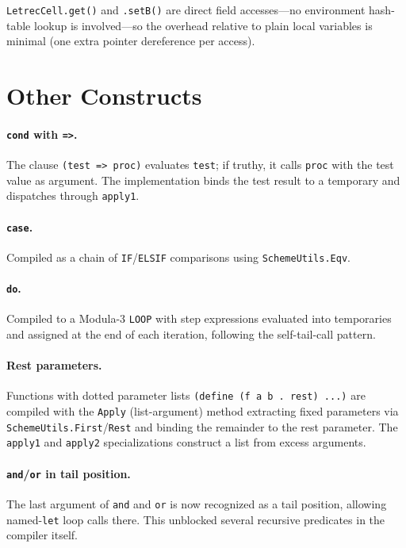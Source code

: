 \documentclass[12pt]{report}
\begin{document}
\texttt{LetrecCell.get()} and \texttt{.setB()} are direct field
accesses---no environment hash-table lookup is involved---so the
overhead relative to plain local variables is minimal (one extra
pointer dereference per access).

\section{Other Constructs}
\label{sec:gap-other}

\paragraph{\texttt{cond} with \texttt{=>}.}
The clause \texttt{(test => proc)} evaluates \texttt{test}; if
truthy, it calls \texttt{proc} with the test value as argument.
The implementation binds the test result to a temporary and
dispatches through \texttt{apply1}.

\paragraph{\texttt{case}.}
Compiled as a chain of \texttt{IF}/\texttt{ELSIF} comparisons
using \texttt{SchemeUtils.Eqv}.

\paragraph{\texttt{do}.}
Compiled to a Modula-3 \texttt{LOOP} with step expressions
evaluated into temporaries and assigned at the end of each
iteration, following the self-tail-call pattern.

\paragraph{Rest parameters.}
Functions with dotted parameter lists
\texttt{(define (f a b .\ rest) ...)} are compiled with the
\texttt{Apply} (list-argument) method extracting fixed parameters
via \texttt{SchemeUtils.First}/\texttt{Rest} and binding the
remainder to the rest parameter.  The \texttt{apply1} and
\texttt{apply2} specializations construct a list from excess
arguments.

\paragraph{\texttt{and}/\texttt{or} in tail position.}
The last argument of \texttt{and} and \texttt{or} is now
recognized as a tail position, allowing named-\texttt{let}
loop calls there.  This unblocked several recursive
predicates in the compiler itself.
\end{document}
